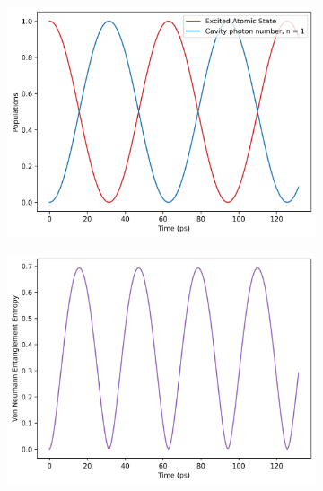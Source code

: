 \documentclass[11pt]{article}
\begin{document}
\begin{figure}[H]
    \centering
    \begin{subfigure}{0.45\textwidth}
        \centering
        \includegraphics[width=\linewidth]{Research Project/Code/results/JCM/CQS_expt.png}
        \caption{}
        \label{fig:JCM_cqs_xpt_e0}
    \end{subfigure}
    \begin{subfigure}{0.45\textwidth}
        \centering
        \includegraphics[width=\linewidth]{Research Project/Code/results/JCM/CQS_vne.png}
        \caption{}
        \label{fig:JCM_cqs_vne_e0}
    \end{subfigure}
    
        \vspace{0.5cm}
    

\end{figure}
\end{document}
